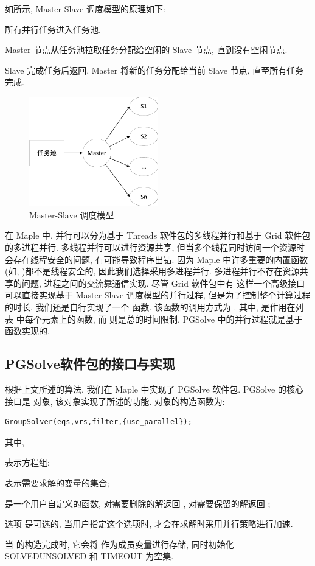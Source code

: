 如所示, Master-Slave 调度模型的原理如下:
\begin{compactenum}[Step 1.]
\item 所有并行任务进入任务池.
\item Master 节点从任务池拉取任务分配给空闲的 Slave 节点, 直到没有空闲节点.
\item Slave 完成任务后返回, Master 将新的任务分配给当前 Slave 节点, 直至所有任务完成. 
\end{compactenum}

\begin{figure}[htbp]
\centering 
\includegraphics[width=0.5\textwidth]{fig/msp.pdf}
\caption{Master-Slave 调度模型}\label{msp}
\end{figure}

在 Maple 中, 并行可以分为基于 Threads 软件包的多线程并行和基于 Grid 软件包的多进程并行. 多线程并行可以进行资源共享, 但当多个线程同时访问一个资源时会存在线程安全的问题, 有可能导致程序出错. 因为 Maple 中许多重要的内置函数(如, )都不是线程安全的, 因此我们选择采用多进程并行. 多进程并行不存在资源共享的问题, 进程之间的交流靠通信实现. 尽管 Grid 软件包中有  这样一个高级接口可以直接实现基于 Master-Slave 调度模型的并行过程, 但是为了控制整个计算过程的时长, 我们还是自行实现了一个  函数. 该函数的调用方式为 . 其中,  是作用在列表  中每个元素上的函数, 而  则是总的时间限制. PGSolve 中的并行过程就是基于  函数实现的. 

\subsection{PGSolve软件包的接口与实现}
根据上文所述的算法, 我们在 Maple 中实现了 PGSolve 软件包. PGSolve 的核心接口是  对象, 该对象实现了所述的功能. 对象的构造函数为: 
\begin{verbatim}
GroupSolver(eqs,vrs,filter,{use_parallel});
\end{verbatim}
其中, 
\begin{compactitem}[\textbullet]
\item {} 表示方程组;
\item {} 表示需要求解的变量的集合;
\item {} 是一个用户自定义的函数, 对需要删除的解返回 , 对需要保留的解返回 ;
\item 选项  是可选的, 当用户指定这个选项时,  才会在求解时采用并行策略进行加速.
\end{compactitem}
当  的构造完成时, 它会将  作为成员变量进行存储, 同时初始化 SOLVED\D UNSOLVED 和 TIMEOUT 为空集. 


